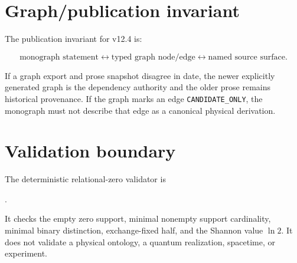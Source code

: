 \documentclass[11pt,a4paper,twoside]{book}
\theoremstyle{definition}
\begin{document}
\section{Graph/publication invariant}

The publication invariant for v12.4 is:

\[
\boxed{
\text{monograph statement}
\longleftrightarrow
\text{typed graph node/edge}
\longleftrightarrow
\text{named source surface}.
}
\]

If a graph export and prose snapshot disagree in date, the newer explicitly generated graph
is the dependency authority and the older prose remains historical provenance. If the graph
marks an edge \texttt{CANDIDATE\_ONLY}, the monograph must not describe that edge as a
canonical physical derivation.

\section{Validation boundary}

The deterministic relational-zero validator is

.

It checks the empty zero support, minimal nonempty support cardinality, minimal binary
distinction, exchange-fixed half, and the Shannon value $\ln2$. It does not validate a
physical ontology, a quantum realization, spacetime, or experiment.

\clearpage




\pagestyle{headings}


\end{document}
